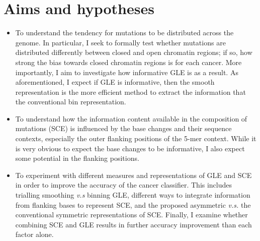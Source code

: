 \section{Aims and hypotheses}
\label{intro:aims}
\begin{itemize}
    \item To understand the tendency for mutations to be distributed across the genome. In particular, I seek to formally test whether mutations are distributed differently between closed and open chromatin regions; if so, how strong the bias towards closed chromatin regions is for each cancer. More importantly, I aim to investigate how informative GLE is as a result. As aforementioned, I expect if GLE is informative, then the smooth representation is the more efficient method to extract the information that the conventional bin representation.
    \item To understand how the information content available in the composition of mutations (SCE) is influenced by the base changes and their sequence contexts, especially the outer flanking positions of the 5-mer context. While it is very obvious to expect the base changes to be informative, I also expect some potential in the flanking positions. 
    \item To experiment with different measures and representations of GLE and SCE in order to improve the accuracy of the cancer classifier. This includes trialling smoothing \textit{v.s} binning GLE, different ways to integrate information from flanking bases to represent SCE, and the proposed asymmetric \textit{v.s.} the conventional symmetric representations of SCE. Finally, I examine whether combining SCE and GLE results in further accuracy improvement than each factor alone.  
\end{itemize}


